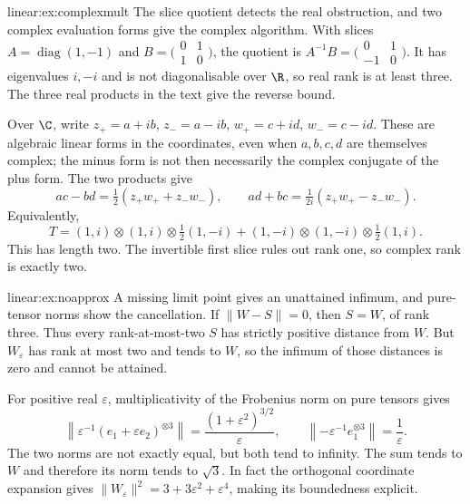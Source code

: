 \begin{solution}{linear:ex:complexmult}
\idea The slice quotient detects the real obstruction, and two complex evaluation forms give the complex algorithm.
\writeup With slices $A=\operatorname{diag}(1,-1)$ and $B=\bigl(\begin{smallmatrix}0&1\\1&0\end{smallmatrix}\bigr)$, the quotient is
$A^{-1}B=\bigl(\begin{smallmatrix}0&1\\-1&0\end{smallmatrix}\bigr)$. It has eigenvalues $i,-i$ and is not diagonalisable over $\R$, so real rank is at least three. The three real products in the text give the reverse bound.

Over $\C$, write $z_+=a+ib$, $z_-=a-ib$, $w_+=c+id$, $w_-=c-id$. These are algebraic linear forms in the coordinates, even when $a,b,c,d$ are themselves complex; the minus form is not then necessarily the complex conjugate of the plus form. The two products give
\[
ac-bd=\tfrac12(z_+w_++z_-w_-),\qquad
ad+bc=\tfrac1{2i}(z_+w_+-z_-w_-).
\]
Equivalently,
\[
T=(1,i)\otimes(1,i)\otimes\tfrac12(1,-i)
 +(1,-i)\otimes(1,-i)\otimes\tfrac12(1,i).
\]
This has length two. The invertible first slice rules out rank one, so complex rank is exactly two.
\end{solution}

\begin{solution}{linear:ex:noapprox}
\idea A missing limit point gives an unattained infimum, and pure-tensor norms show the cancellation.
\writeup If $\|W-S\|=0$, then $S=W$, of rank three. Thus every rank-at-most-two $S$ has strictly positive distance from $W$. But $W_\varepsilon$ has rank at most two and tends to $W$, so the infimum of those distances is zero and cannot be attained.

For positive real $\varepsilon$, multiplicativity of the Frobenius norm on pure tensors gives
\[
\left\|\varepsilon^{-1}(e_1+\varepsilon e_2)^{\otimes3}\right\|
 =\frac{(1+\varepsilon^2)^{3/2}}{\varepsilon},\qquad
\left\|-\varepsilon^{-1}e_1^{\otimes3}\right\|=\frac1\varepsilon.
\]
The two norms are not exactly equal, but both tend to infinity. The sum tends to $W$ and therefore its norm tends to $\sqrt3$. In fact the orthogonal coordinate expansion gives $\|W_\varepsilon\|^2=3+3\varepsilon^2+\varepsilon^4$, making its boundedness explicit.
\end{solution}


